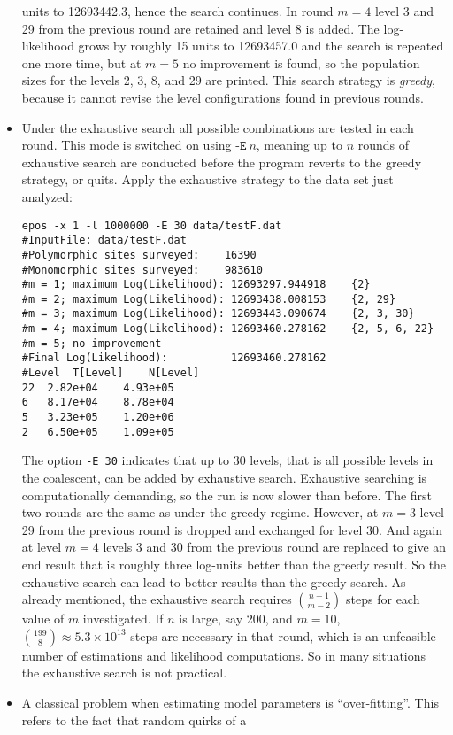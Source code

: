 \documentclass[a4paper, english]{article}
\newcommand{\ty}{\texttt}
\begin{document}
\begin{itemize}
units to 12693442.3, hence the search continues. In round $m=4$ level 3 and
29 from the previous round are retained and level 8 is added. The
log-likelihood grows by roughly 15 units to 12693457.0 and the search is repeated
one more time, but at $m=5$ no improvement is found, so the population
sizes for the levels 2, 3, 8, and 29 are printed. This search strategy
is \emph{greedy}, because it cannot revise the level configurations
found in previous rounds.
\item Under the exhaustive search all possible combinations are tested in each
round. This mode is switched on using $\ty{-E}\ n$, meaning up to $n$
rounds of exhaustive search are conducted before the program reverts
to the greedy strategy, or quits. Apply the exhaustive strategy to the
data set just analyzed:
\begin{verbatim}
epos -x 1 -l 1000000 -E 30 data/testF.dat 
#InputFile:	data/testF.dat
#Polymorphic sites surveyed:	16390
#Monomorphic sites surveyed:	983610
#m = 1; maximum Log(Likelihood): 12693297.944918	{2}
#m = 2; maximum Log(Likelihood): 12693438.008153	{2, 29}
#m = 3; maximum Log(Likelihood): 12693443.090674	{2, 3, 30}
#m = 4; maximum Log(Likelihood): 12693460.278162	{2, 5, 6, 22}
#m = 5; no improvement
#Final Log(Likelihood):          12693460.278162
#Level	T[Level]	N[Level]
22	2.82e+04	4.93e+05
6	8.17e+04	8.78e+04
5	3.23e+05	1.20e+06
2	6.50e+05	1.09e+05
\end{verbatim}
The option \ty{-E 30} indicates that up to 30 levels, that is all
possible levels in the coalescent, can be added by
exhaustive search. Exhaustive searching is computationally demanding, so the run is
now slower than before. The first two rounds are the same as under the
greedy regime. However, at $m=3$ level 29 from the previous round is
dropped and exchanged for level 30. And again at level $m=4$ levels 3
and 30 from the previous round are replaced to give an end result that
is roughly three log-units better than the greedy result. So the
exhaustive search can lead to better results than the greedy
search. As already mentioned, the exhaustive search requires ${n-1\choose
  m-2}$ steps for each value of $m$ investigated. If $n$ is large, say
200, and $m=10$, ${199\choose 8}\approx
5.3\times10^{13}$ steps are necessary in that round, which is an unfeasible number of estimations and
likelihood computations. So in many situations the exhaustive search
is not practical.
\item A classical problem when estimating model parameters is
  ``over-fitting''. This refers to the fact that random quirks of a

\end{itemize}
\end{document}
